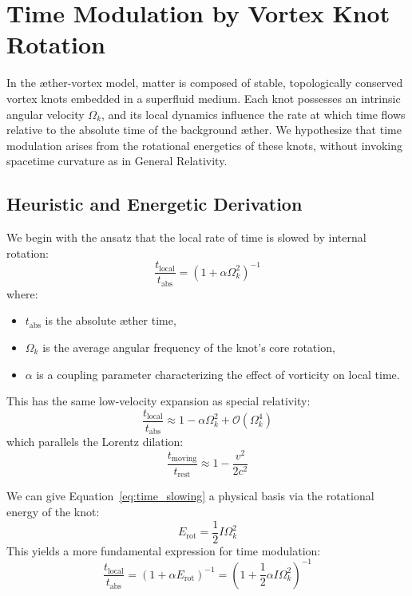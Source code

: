 \section{Time Modulation by Vortex Knot Rotation}

In the æther-vortex model, matter is composed of stable, topologically conserved vortex knots embedded in a superfluid medium. Each knot possesses an intrinsic angular velocity $\Omega_k$, and its local dynamics influence the rate at which time flows relative to the absolute time of the background æther. We hypothesize that time modulation arises from the rotational energetics of these knots, without invoking spacetime curvature as in General Relativity.

\subsection{Heuristic and Energetic Derivation}

We begin with the ansatz that the local rate of time is slowed by internal rotation:
\begin{equation}
    \label{eq:time_slowing}
    \frac{t_{\text{local}}}{t_{\text{abs}}} = \left(1 + \alpha \Omega_k^2 \right)^{-1}
\end{equation}
where:
\begin{itemize}
    \item $t_{\text{abs}}$ is the absolute æther time,
    \item $\Omega_k$ is the average angular frequency of the knot’s core rotation,
    \item $\alpha$ is a coupling parameter characterizing the effect of vorticity on local time.
\end{itemize}

This has the same low-velocity expansion as special relativity:
\begin{equation}
    \frac{t_{\text{local}}}{t_{\text{abs}}} \approx 1 - \alpha \Omega_k^2 + \mathcal{O}(\Omega_k^4)
\end{equation}
which parallels the Lorentz dilation:
\[
    \frac{t_{\text{moving}}}{t_{\text{rest}}} \approx 1 - \frac{v^2}{2c^2}
\]

We can give Equation~\ref{eq:time_slowing} a physical basis via the rotational energy of the knot:
\[
    E_{\text{rot}} = \frac{1}{2} I \Omega_k^2
\]
This yields a more fundamental expression for time modulation:
\begin{equation}
    \label{eq:time_energy}
    \frac{t_{\text{local}}}{t_{\text{abs}}} = \left(1 + \alpha E_{\text{rot}} \right)^{-1} = \left(1 + \frac{1}{2} \alpha I \Omega_k^2 \right)^{-1}
\end{equation}

